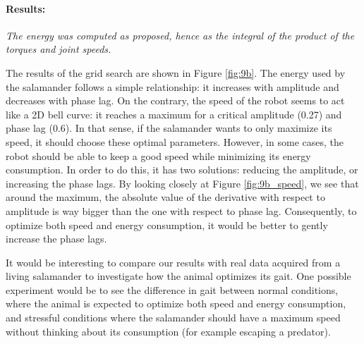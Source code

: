 \documentclass{cmc}
\begin{document}
\paragraph{Results:}
\textit{The energy was computed as proposed, hence as the integral of the product of the torques and joint speeds.}

The results of the grid search are shown in Figure \ref{fig:9b}. The energy used by the salamander follows a simple relationship: it increases with amplitude and decreases with phase lag. On the contrary, the speed of the robot seems to act like a 2D bell curve: it reaches a maximum for a critical amplitude (0.27) and phase lag (0.6). In that sense, if the salamander wants to only maximize its speed, it should choose these optimal parameters. However, in some cases, the robot should be able to keep a good speed while minimizing its energy consumption. In order to do this, it has two solutions: reducing the amplitude, or increasing the phase lags. By looking closely at Figure \ref{fig:9b_speed}, we see that around the maximum, the absolute value of the derivative with respect to amplitude is way bigger than the one with respect to phase lag. Consequently, to optimize both speed and energy consumption, it would be better to gently increase the phase lags. 

It would be interesting to compare our results with real data acquired from a living salamander to investigate how the animal optimizes its gait. One possible experiment would be to see the difference in gait between normal conditions, where the animal is expected to optimize both speed and energy consumption, and stressful conditions where the salamander should have a maximum speed without thinking about its consumption (for example escaping a predator). 
\end{document}
